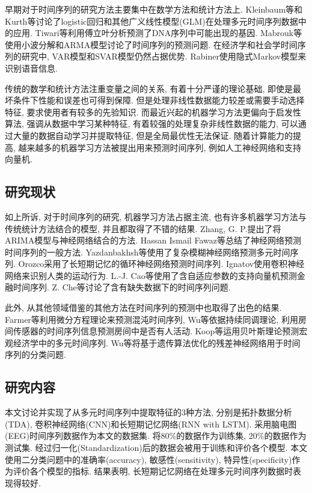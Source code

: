 \documentclass[12pt]{ctexart}
\begin{document}
早期对于时间序列的研究方法主要集中在数学方法和统计方法上. Kleinbaum等和Kurth等讨论了logistic回归和其他广义线性模型(GLM)在处理多元时间序列数据中的应用\cite{ref4,ref5}. Tiwari等利用傅立叶分析预测了DNA序列中可能出现的基因\cite{ref6}. Mabrouk等使用小波分解和ARMA模型讨论了时间序列的预测问题\cite{ref7}. 在经济学和社会学时间序列的研究中, VAR模型和SVAR模型仍然占据优势\cite{ref8,ref9,ref10}. Rabiner使用隐式Markov模型来识别语音信息\cite{ref11}. 

传统的数学和统计方法注重变量之间的关系, 有着十分严谨的理论基础, 即使是最坏条件下性能和误差也可得到保障. 但是处理非线性数据能力较差或需要手动选择特征, 要求使用者有较多的先验知识. 而最近兴起的机器学习方法更偏向于启发性算法, 强调从数据中学习某种特征, 有着较强的处理复杂非线性数据的能力, 可以通过大量的数据自动学习并提取特征, 但是全局最优性无法保证. 随着计算能力的提高, 越来越多的机器学习方法被提出用来预测时间序列, 例如人工神经网络\cite{ref12}和支持向量机\cite{ref13}.

\subsection{研究现状}
如上所诉, 对于时间序列的研究, 机器学习方法占据主流, 也有许多机器学习方法与传统统计方法结合的模型, 并且都取得了不错的结果. Zhang, G. P.提出了将ARIMA模型与神经网络结合的方法\cite{ref14}. Hassan Ismail Fawaz等总结了神经网络预测时间序列的一般方法\cite{ref28}. Yazdanbakhsh等使用了复杂模糊神经网络预测多元时间序列\cite{ref16}. Orozco采用了长短期记忆的循环神经网络预测时间序列\cite{ref17}. Ignatov使用卷积神经网络来识别人类的运动行为\cite{ref18}. L.-J. Cao等使用了含自适应参数的支持向量机预测金融时间序列\cite{ref19}. Z. Che等讨论了含有缺失数据下的时间序列问题\cite{ref20}. 

此外, 从其他领域借鉴的其他方法在时间序列的预测中也取得了出色的结果. Farmer等利用微分方程理论来预测混沌时间序列\cite{ref21}, Wu等依据持续同调理论, 利用房间传感器的时间序列信息预测房间中是否有人活动\cite{ref22}. Koop等运用贝叶斯理论预测宏观经济学中的多元时间序列\cite{ref23}. Wu等将基于遗传算法优化的残差神经网络用于时间序列的分类问题\cite{ref24}.
\subsection{研究内容}
本文讨论并实现了从多元时间序列中提取特征的3种方法, 分别是拓扑数据分析(TDA), 卷积神经网络(CNN)和长短期记忆网络(RNN with LSTM). 采用脑电图(EEG)时间序列数据作为本文的数据集. 将80\%的数据作为训练集, 20\%的数据作为测试集. 经过归一化(Standardization)后的数据会被用于训练和评价各个模型. 本文使用二分类问题中的准确率(accuracy), 敏感性(sensitivity), 特异性(specificity)作为评价各个模型的指标. 结果表明, 长短期记忆网络在处理多元时间序列数据时表现得较好.
\end{document}
